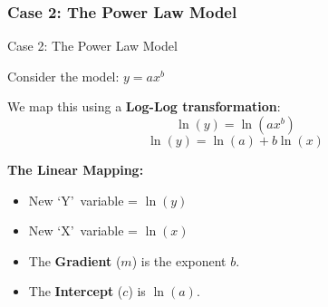\subsubsection{Case 2: The Power Law Model}
\begin{frame}{Case 2: The Power Law Model}
    \begin{example}
        Consider the model: $y = ax^b$
    \end{example}

    \begin{solution}
        We map this using a \textbf{Log-Log transformation}:
        $$\ln(y) = \ln(ax^b)$$
        $$\ln(y) = \ln(a) + b \ln(x)$$
        
        \vspace{0.2cm}
        \textbf{The Linear Mapping:}
        \begin{itemize}
            \item New \lq Y\rq\ variable = $\ln(y)$
            \item New \lq X\rq\ variable = $\ln(x)$
            \item The \textbf{Gradient} ($m$) is the exponent $b$.
            \item The \textbf{Intercept} ($c$) is $\ln(a)$.
        \end{itemize}
    \end{solution}
\end{frame}

